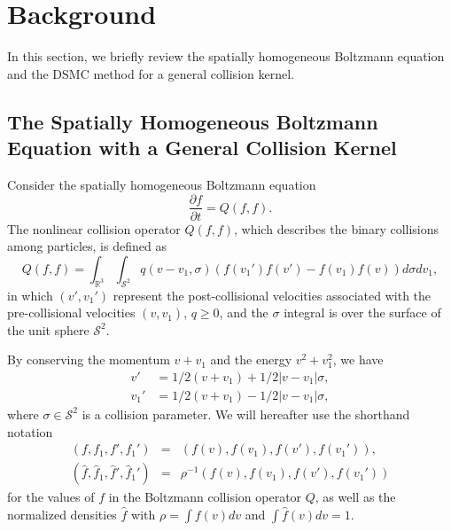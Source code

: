 \documentclass[12pt,nopreprintline]{elsarticle}
\newcommand{\bbR}{\mathbb R} \newcommand{\bbS}{\mathbb S}
\newcommand{\cS}{\mathcal S} \newcommand{\cT}{\mathcal T}
\begin{document}





\section{Background}\label{sec:background}
In this section, we briefly review the spatially homogeneous Boltzmann equation and the DSMC method for a general collision kernel.

\subsection{The Spatially Homogeneous Boltzmann Equation with a General Collision Kernel}
Consider the spatially homogeneous Boltzmann equation
\begin{equation}\label{eq:homoBoltz}
    \frac{\partial f}{\partial t}  =  Q(f,f).
\end{equation}
The nonlinear collision operator $Q(f,f)$, which describes the binary collisions among particles, is defined as
\begin{equation*}%
    Q(f,f) = \int_{\bbR^3} \int_{\cS^2} q(v-v_1,\sigma) (f(v_1')f(v') - f(v_1) f(v)) d\sigma dv_1,
\end{equation*}
in which  $(v',v_1')$ represent the post-collisional velocities associated with the pre-collisional velocities $(v,v_1)$, $q\geq 0$, and the $\sigma$ integral is over the surface of the unit sphere $\cS^2$. 



By conserving the momentum $v+v_1$ and the energy $v^2 + v_1^2$, we have
\begin{equation}\label{BoltzmannSolution}
\begin{split}
v' &= 1/2 (v+v_1) + 1/2 |v-v_1| \sigma,  \\
v_1'&=1/2 (v+v_1) - 1/2  |v-v_1| \sigma,
\end{split}
\end{equation}
where $\sigma \in \cS^2$ is a collision parameter. We will hereafter use the shorthand notation 
\begin{eqnarray*}%
 (f, f_1, f', f_1') &=&  (  f(v), f(v_1), f(v'), f(v_1') ), \\
 (\hat f, \hat f_1,\hat f',  \hat f_1') &=&  \rho^{-1}(  f(v), f(v_1), f(v'), f(v_1') )
\end{eqnarray*}
for the values of $f$ in the Boltzmann collision operator $Q$, as well as the normalized densities $\hat f$ with $\rho = \int f(v) dv$ and $\int \hat f(v) dv=1$.
\end{document}
